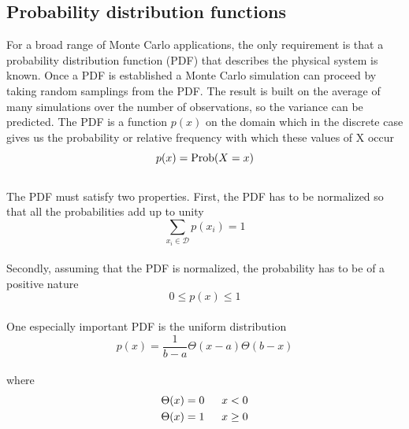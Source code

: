\documentclass[%
reprint,nofootinbib,
amsmath,amssymb,
aps,
]{revtex4-1}
\begin{document}
\subsection*{Probability distribution functions}\noindent
For a broad range of Monte Carlo applications, the only requirement is that a probability distribution function (PDF) that describes the physical system is known. Once a PDF is established a Monte Carlo simulation can proceed by taking random samplings from the PDF. The result is built on the average of many simulations over the number of observations, so the variance can be predicted. The PDF is a function $p(x)$ on the domain which in the discrete case gives us the probability or relative frequency with which these values of X occur \vspace{0.5mm} \\
\begin{equation*}
p(x) = \textnormal{Prob}(X=x)
\end{equation*}\vspace{0.5mm} \\
The PDF must satisfy two properties. First, the PDF has to be normalized so that all the probabilities add up to unity\vspace{0.5mm} \\
\begin{equation*}
\sum_{x_i\in \mathcal{D}} p(x_i) = 1
\end{equation*} \vspace{0.5mm} \\
Secondly, assuming that the PDF is normalized, the probability has to be of a positive nature \vspace{0.5mm} \\
\begin{equation*}
0 \leq p(x) \leq 1
\end{equation*}\vspace{0.5mm} \\
One especially important PDF is the uniform distribution\vspace{2mm} \\
\begin{equation}\label{unipdf}
p(x) = \dfrac{1}{b-a}\Theta(x-a)\Theta(b-x)
\end{equation}\vspace{0.5mm} \\
where 
\begin{align}
\Theta(x) &= 0& \hspace{2mm} x < 0 \nonumber \\
\Theta(x) &= 1& \hspace{2mm} x \geq 0 
\end{align}\\ 
\end{document}
